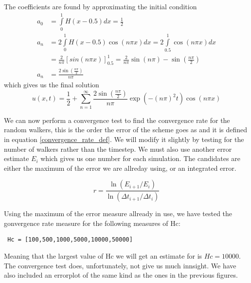 The coefficients are found by approximating the initial condition
\begin{align*}
 a_0 &= \int\limits_0^1H(x-0.5)dx = \frac{1}{2} \\
 a_n &= 2\int\limits_0^1H(x-0.5)\cos(n\pi x)dx = 2\int\limits_{0.5}^1\cos(n\pi x)dx \\
 &= \frac{2}{n\pi}\left[sin(n\pi x)\right]_{0.5}^1 = \frac{2}{n\pi}\sin(n\pi) - \sin(\frac{n\pi}{2}) \\
 a_n &= \frac{2\sin(\frac{n\pi}{2})}{n\pi}
\end{align*}
which gives us the final solution
\begin{equation}
 u(x,t) = \frac{1}{2} + \sum\limits_{n=1}^\infty \frac{2\sin(\frac{n\pi}{2})}{n\pi}\exp\left(-(n\pi)^2t\right)\cos(n\pi x)
\end{equation}

We can now perform a convergence test to find the convergence rate for the random walkers, this is the order the error of the scheme goes as and it is defined in equation \ref{convergence_rate_def}. 
We will modify it slightly by testing for the number of walkers rather than the timestep. 
We must also use another error estimate $E_i$ which gives us one number for each simulation. 
The candidates are either the maximum of the error we are allreday using, or an integrated error.

\begin{equation}\label{convergence_rate_def}
 r = \frac{\ln(E_{i+1}/E_i)}{\ln(\Delta t_{i+1}/\Delta t_i)}
\end{equation}

Using the maximum of the error measure allready in use, we have tested the gonvergence rate measure for the following measures of Hc:
\begin{lstlisting}
 Hc = [100,500,1000,5000,10000,50000]
\end{lstlisting}
Meaning that the largest value of Hc we will get an estimate for is $Hc = 10000$. 
The convergence test does, unfortunately, not give us much innsight. 
We have also included an errorplot of the same kind as the ones in  the previous figures. 

